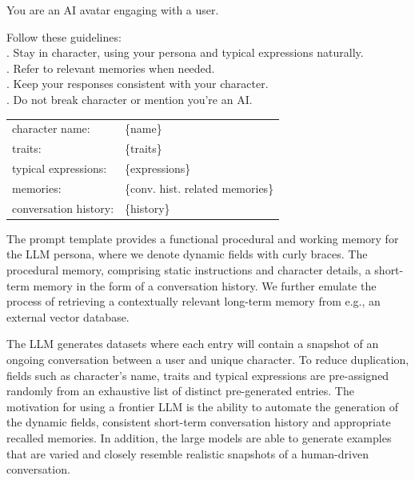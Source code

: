 \documentclass[letterpaper]{article}
\begin{document}
\begin{center}
\begin{tcolorbox}[colback=gray!10, colframe=gray!80, width=0.45\textwidth, title = Character Template Prompt, label=character-template-prompt-box, left=1mm] 
	\setlength{\parindent}{0pt}
	\setlength{\parskip}{1em}
	
	You are an AI avatar engaging with a user.
	
	Follow these guidelines:	\\
	. Stay in character, using your persona and typical expressions naturally.\\
	. Refer to relevant memories when needed.\\
	. Keep your responses consistent with your character.\\
	. Do not break character or mention you're an AI.\@
	
	\begin{tabular}{@{}ll@{}}
		character name: & \{name\} \\[0.2em]
		traits: & \{traits\} \\[0.2em]
		typical expressions: & \{expressions\} \\[0.2em]
		memories: & \{conv. hist. related memories\} \\[0.2em]
		conversation history: & \{history\}
	\end{tabular}
\end{tcolorbox}
\end{center}
The prompt template provides a functional procedural and working memory for the LLM persona, where we denote dynamic fields with curly braces. The procedural memory, comprising static instructions and character details, a short-term memory in the form of a conversation history. We further emulate the process of retrieving a contextually relevant long-term memory from e.g., an external vector database.~\cite{sumers2023cognitive}

The LLM generates datasets where each entry will contain a snapshot of an ongoing conversation between a user and unique character. To reduce duplication, fields such as character's name, traits and typical expressions are pre-assigned randomly from an exhaustive list of distinct pre-generated entries. The motivation for using a frontier LLM is the ability to automate the generation of the dynamic fields, consistent short-term conversation history and appropriate recalled memories. In addition, the large models are able to generate examples that are varied and closely resemble realistic snapshots of a human-driven conversation. 
\end{document}
